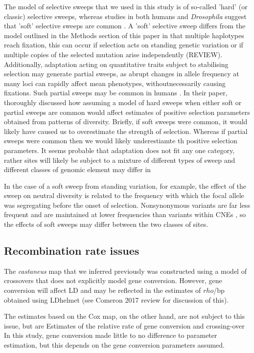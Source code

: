 \documentclass[11pt]{article}
\begin{document}
	The model of selective sweeps that we used in this study is of so-called 'hard' (or classic) selective sweeps, whereas studies in both humans and \textit{Drosophila} suggest that 'soft' selective sweeps are common \citep{RN303, RN208, RN338}. A 'soft' selective sweep differs from the model outlined in the Methods section of this paper in that multiple haplotypes reach fixation, this can occur if selection acts on standing genetic variation or if multiple copies of the selected mutation arise independently (REVIEW). Additionally, adaptation acting on quantitative traits subject to stabilising selection may generate partial sweeps, as abrupt changes in allele frequency at many loci can rapidly affect mean phenotypes, withoutnecessarily causing fixations. Such partial sweeps may be common in humans \citep{RN301}. In their paper, \cite{RN274} thoroughly discussed how assuming a model of hard sweeps when either soft or partial sweeps are common would affect estimates of positive selection parameters obtained from patterns of diversity. Briefly, if soft sweeps were common, it would likely have caused us to overestimate the strength of selection. Whereas if partial sweeps were common then we would likely underestiamte th positive selection parameters. It seems probable that adaptation does not fit any one category, rather sites will likely be subject to a mixture of different types of sweep and different classes of genomic element may differ in 

	In the case of a soft sweep from standing variation, for example, the effect of the sweep on neutral diversity is related to the frequency with which the focal allele was segregating before the onset of selection. Nonsynonymous variants are far less frequent and are maintained at lower frequencies than variants within CNEs \citep{RN122}, so the effects of soft sweeps may differ between the two classes of sites.

\subsection{Recombination rate issues}

	The \textit{castaneus} map that we inferred previously \citep{RN340} was constructed using a model of crossovers that does not explicitly model gene conversion. However, gene conversion will affect LD and may be reflected in the estimates of $rho$/bp  obtained using LDhelmet (see Comeron 2017 review for discussion of this).
	
	The estimates based on the Cox map, on the other hand, are not subject to this issue, but are 
	Estimates of the relative rate of gene conversion and crossing-over 
		In this study, gene conversion made little to no difference to parameter estimation, but this depends on the gene conversion parameters assumed. 
\end{document}
